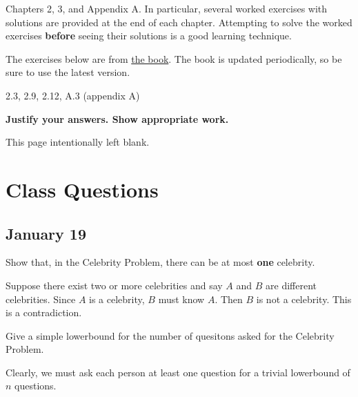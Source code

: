 \documentclass[draft]{article}
\begin{document}
\begin{titlepage}
    \begin{tcolorbox}[title=Reading,fonttitle=\bfseries]
        Chapters 2, 3, and Appendix A. In particular, several worked exercises with solutions are provided at the end of each chapter. Attempting to solve the worked exercises \textbf{before} seeing their solutions is a good learning technique.
    \end{tcolorbox}
    The exercises below are from \href{https://sites.google.com/site/gopalpandurangan/home/algorithms-course}{the book}. The book is updated periodically, so be sure to use the latest version.

    \begin{tcolorbox}[title=Exercises,fonttitle=\bfseries]
        2.3, 2.9, 2.12, A.3 (appendix A)
    \end{tcolorbox}

    \textbf{Justify your answers. Show appropriate work.}
\end{titlepage}
\vspace*{\fill}\begin{center}{\Huge This page intentionally left blank.}\end{center}\vspace*{\fill}\thispagestyle{empty}\clearpage
{}

\section{Class Questions}
\subsection{January 19}

\begin{question}
    Show that, in the Celebrity Problem, there can be at most \textbf{one} celebrity.
\end{question}

\begin{solution}
    Suppose there exist two or more celebrities and say $A$ and $B$ are different celebrities. Since $A$ is a celebrity, $B$ must know $A$. Then $B$ is not a celebrity. This is a contradiction.
\end{solution}

\begin{question}
    Give a simple lowerbound for the number of quesitons asked for the Celebrity Problem.
\end{question}

\begin{solution}
    Clearly, we must ask each person at least one question for a trivial lowerbound of $n$ questions.
\end{solution}
\end{document}
